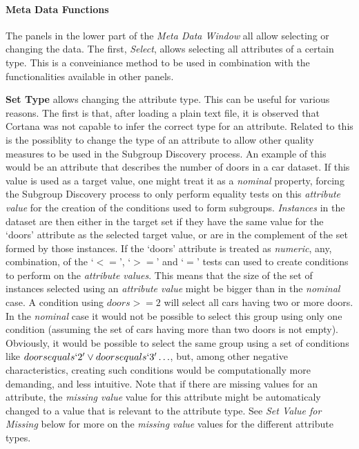 \documentclass{article}
\begin{document}
\paragraph{Meta Data Functions}
\label{meta-data-window:meta-data-functions}

The panels in the lower part of the \emph{Meta Data Window} all allow selecting or changing the data.
The first, \emph{Select}, allows selecting all attributes of a certain type.
This is a conveiniance method to be used in combination with the functionalities available in other panels.

\textbf{Set Type} allows changing the attribute type.
This can be useful for various reasons.
The first is that, after loading a plain text file, it is observed that Cortana was not capable to infer the correct type for an attribute.
Related to this is the possiblity to change the type of an attribute to allow other quality measures to be used in the Subgroup Discovery process.
An example of this would be an attribute that describes the number of doors in a car dataset.
If this value is used as a target value, one might treat it as a \emph{nominal} property, forcing the Subgroup Discovery process to only perform equality tests on this \emph{attribute value} for the creation of the conditions used to form subgroups.
\emph{Instances} in the dataset are then either in the target set if they have the same value for the `doors' attribute as the selected target value, or are in the complement of the set formed by those instances.
If the `doors' attribute is treated as \emph{numeric}, any, combination, of the `$<=$', `$>=$' and `$=$' tests can used to create conditions to perform on the \emph{attribute values}.
This means that the size of the set of instances selected using an \emph{attribute value} might be bigger than in the \emph{nominal} case.
A condition using $doors >= 2$ will select all cars having two or more doors.
In the \emph{nominal} case it would not be possible to select this group using only one condition (assuming the set of cars having more than two doors is not empty).
Obviously, it would be possible to select the same group using a set of conditions like $doors equals `2' \vee doors equals `3' \ldots$, but, among other negative characteristics, creating such conditions would be computationally more demanding, and less intuitive.
Note that if there are missing values for an attribute, the \emph{missing value} value for this attribute might be automaticaly changed to a value that is relevant to the attribute type.
See \emph{Set Value for Missing} below for more on the \emph{missing value} values for the different attribute types.
\end{document}

